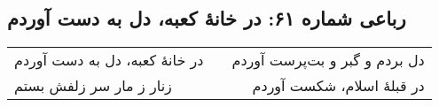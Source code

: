 \begin{center}
\section*{رباعی شماره ۶۱: در خانهٔ کعبه، دل به دست آوردم}
\label{sec:061}
\begin{longtable}{l p{0.5cm} r}
در خانهٔ کعبه، دل به دست آوردم
&&
دل بردم و گبر و بت‌پرست آوردم
\\
زنار ز مار سر زلفش بستم
&&
در قبلهٔ اسلام، شکست آوردم
\\
\end{longtable}
\end{center}
